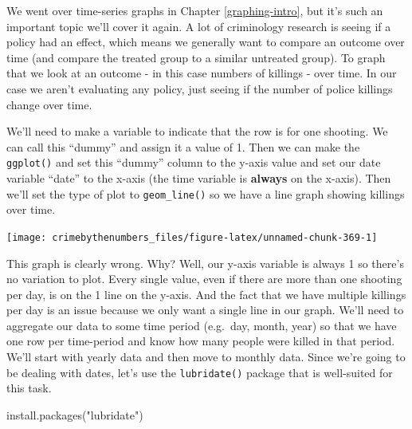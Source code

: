 \documentclass[
]{krantz}
\makeatletter
\newenvironment{Shaded}{\begin{snugshade}}{\end{snugshade}}
\newcommand{\AttributeTok}[1]{\textcolor[rgb]{0.61,0.61,0.61}{#1}}
\newcommand{\DecValTok}[1]{\textcolor[rgb]{0.06,0.06,0.06}{#1}}
\newcommand{\FunctionTok}[1]{\textcolor[rgb]{0,0,0}{#1}}
\newcommand{\NormalTok}[1]{#1}
\newcommand{\OtherTok}[1]{\textcolor[rgb]{0.37,0.37,0.37}{#1}}
\newcommand{\SpecialCharTok}[1]{\textcolor[rgb]{0,0,0}{#1}}
\newcommand{\StringTok}[1]{\textcolor[rgb]{0.5,0.5,0.5}{#1}}
\newenvironment{kframe}{%
\medskip{}
\setlength{\fboxsep}{.8em}
 \def\at@end@of@kframe{}%
 \ifinner\ifhmode%
  \def\at@end@of@kframe{\end{minipage}}%
  \begin{minipage}{\columnwidth}%
 \fi\fi%
 \def\FrameCommand##1{\hskip\@totalleftmargin \hskip-\fboxsep
 \colorbox{shadecolor}{##1}\hskip-\fboxsep
     \hskip-\linewidth \hskip-\@totalleftmargin \hskip\columnwidth}%
 \MakeFramed {\advance\hsize-\width
   \@totalleftmargin\z@ \linewidth\hsize
   \@setminipage}}%
 {\par\unskip\endMakeFramed%
 \at@end@of@kframe}
\renewenvironment{Shaded}{\begin{kframe}}{\end{kframe}}
\makeatother
\begin{document}
We went over time-series graphs in Chapter
\ref{graphing-intro}, but it's such an important topic we'll
cover it again. A lot of criminology research is seeing if a
policy had an effect, which means we generally want to
compare an outcome over time (and compare the treated group
to a similar untreated group). To graph that we look at an
outcome - in this case numbers of killings - over time. In
our case we aren't evaluating any policy, just seeing if the
number of police killings change over time.

We'll need to make a variable to indicate that the row is
for one shooting. We can call this ``dummy'' and assign it a
value of 1. Then we can make the \texttt{ggplot()} and set
this ``dummy'' column to the y-axis value and set our date
variable ``date'' to the x-axis (the time variable is
\textbf{always} on the x-axis). Then we'll set the type of
plot to \texttt{geom\_line()} so we have a line graph
showing killings over time.

\begin{Shaded}
\end{Shaded}

\begin{center}\texttt{[image: crimebythenumbers\_files/figure-latex/unnamed-chunk-369-1]} \end{center}

This graph is clearly wrong. Why? Well, our y-axis variable
is always 1 so there's no variation to plot. Every single
value, even if there are more than one shooting per day, is
on the 1 line on the y-axis. And the fact that we have
multiple killings per day is an issue because we only want a
single line in our graph. We'll need to aggregate our data
to some time period (e.g.~day, month, year) so that we have
one row per time-period and know how many people were killed
in that period. We'll start with yearly data and then move
to monthly data. Since we're going to be dealing with dates,
let's use the \texttt{lubridate()} package that is
well-suited for this task.

\begin{Shaded}
\begin{Highlighting}[]
\FunctionTok{install.packages}\NormalTok{(}\StringTok{"lubridate"}\NormalTok{)}
\end{Highlighting}
\end{Shaded}
\end{document}
